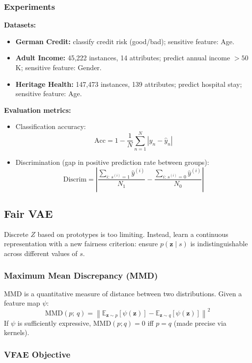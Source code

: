 \documentclass[UTF8]{ctexart}
\begin{document}
\subsubsection{Experiments}
\textbf{Datasets:}
\begin{itemize}
    \item \textbf{German Credit:} classify credit risk (good/bad); sensitive feature: Age.
    \item \textbf{Adult Income:} 45,222 instances, 14 attributes; predict annual income $>50$K; sensitive feature: Gender.
    \item \textbf{Heritage Health:} 147,473 instances, 139 attributes; predict hospital stay; sensitive feature: Age.
\end{itemize}

\textbf{Evaluation metrics:}
\begin{itemize}
    \item Classification accuracy:
    \[
        \mathrm{Acc} = 1 - \frac{1}{N}\sum_{n=1}^{N} |y_n - \hat{y}_n|
    \]
    \item Discrimination (gap in positive prediction rate between groups):
    \[
        \mathrm{Discrim} = \left| \frac{\sum_{i:\,s^{(i)}=1} \hat{y}^{(i)}}{N_1} - \frac{\sum_{i:\,s^{(i)}=0} \hat{y}^{(i)}}{N_0} \right|
    \]
\end{itemize}

\subsection{Fair VAE}

Discrete $Z$ based on prototypes is too limiting. Instead, learn a continuous representation with a new fairness criterion: ensure $p(\mathbf{z} \mid s)$ is indistinguishable across different values of $s$.

\subsubsection{Maximum Mean Discrepancy (MMD)}

MMD is a quantitative measure of distance between two distributions. Given a feature map $\psi$:
\[
    \mathrm{MMD}(p;\, q) = \left\|\mathbb{E}_{\mathbf{z} \sim p}[\psi(\mathbf{z})] - \mathbb{E}_{\mathbf{z} \sim q}[\psi(\mathbf{z})]\right\|^2
\]
If $\psi$ is sufficiently expressive, $\mathrm{MMD}(p;q) = 0$ iff $p = q$ (made precise via kernels).

\subsubsection{VFAE Objective}
\end{document}
